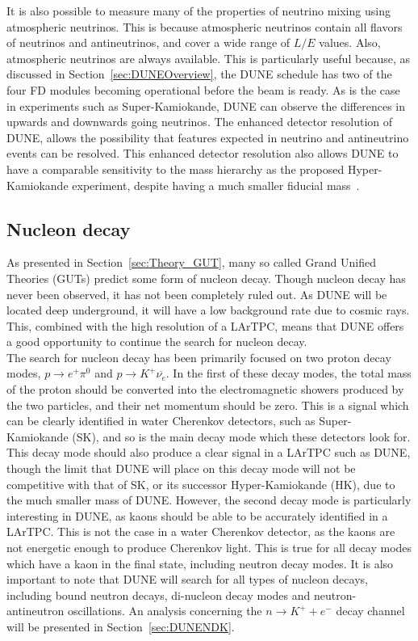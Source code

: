 It is also possible to measure many of the properties of neutrino mixing using atmospheric neutrinos. This is because atmospheric neutrinos contain all flavors of neutrinos and antineutrinos, and cover a wide range of $L/E$ values. Also, atmospheric neutrinos are always available. This is particularly useful because, as discussed in Section~\ref{sec:DUNEOverview}, the DUNE schedule has two of the four FD modules becoming operational before the beam is ready. As is the case in experiments such as Super-Kamiokande, DUNE can observe the differences in upwards and downwards going neutrinos. The enhanced detector resolution of DUNE, allows the possibility that features expected in neutrino and antineutrino events can be resolved. This enhanced detector resolution also allows DUNE to have a comparable sensitivity to the mass hierarchy as the proposed Hyper-Kamiokande experiment, despite having a much smaller fiducial mass~\citep{DUNECDR_V2}.  

\subsection{Nucleon decay} \label{sec:DUNE_NDK}%
As presented in Section~\ref{sec:Theory_GUT}, many so called Grand Unified Theories (GUTs) predict some form of nucleon decay. Though nucleon decay has never been observed, it has not been completely ruled out. As DUNE will be located deep underground, it will have a low background rate due to cosmic rays. This, combined with the high resolution of a LArTPC, means that DUNE offers a good opportunity to continue the search for nucleon decay. \\

The search for nucleon decay has been primarily focused on two proton decay modes, $p \rightarrow e^{+} \pi^{0}$ and $p \rightarrow K^{+} \overline{\nu_{e}}$. In the first of these decay modes, the total mass of the proton should be converted into the electromagnetic showers produced by the two particles, and their net momentum should be zero. This is a signal which can be clearly identified in water Cherenkov detectors, such as Super-Kamiokande (SK), and so is the main decay mode which these detectors look for. This decay mode should also produce a clear signal in a LArTPC such as DUNE, though the limit that DUNE will place on this decay mode will not be competitive with that of SK, or its successor Hyper-Kamiokande (HK), due to the much smaller mass of DUNE. However, the second decay mode is particularly interesting in DUNE, as kaons should be able to be accurately identified in a LArTPC. This is not the case in a water Cherenkov detector, as the kaons are not energetic enough to produce Cherenkov light. This is true for all decay modes which have a kaon in the final state, including neutron decay modes. It is also important to note that DUNE will search for all types of nucleon decays, including bound neutron decays, di-nucleon decay modes and neutron-antineutron oscillations. An analysis concerning the $n \rightarrow K^{+} + e^{-}$ decay channel will be presented in Section~\ref{sec:DUNENDK}. \\

